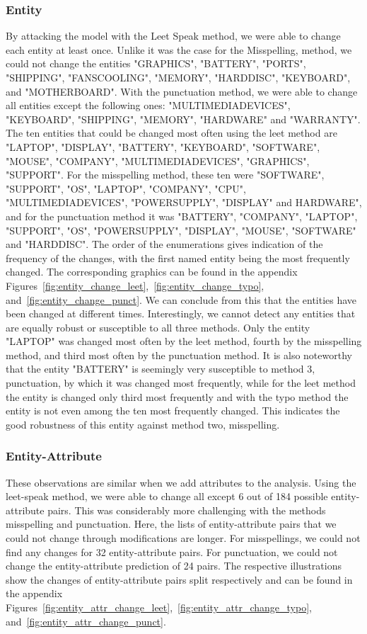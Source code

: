 \subsubsection{Entity}
By attacking the model with the Leet Speak method, we were able to change each entity at least once. Unlike it was the case for the Misspelling,  method, we could not change the entities "GRAPHICS", "BATTERY", "PORTS", "SHIPPING", "FANS\textunderscore COOLING", "MEMORY", "HARD\textunderscore DISC", "KEYBOARD", and "MOTHERBOARD". With the punctuation method, we were able to change all entities except the following ones: "MULTIMEDIA\textunderscore DEVICES", "KEYBOARD", "SHIPPING", "MEMORY", "HARDWARE" and "WARRANTY". 
The ten entities that could be changed most often using the leet method are "LAPTOP", "DISPLAY", "BATTERY", "KEYBOARD", "SOFTWARE", "MOUSE", "COMPANY", "MULTIMEDIA\textunderscore DEVICES", "GRAPHICS", "SUPPORT". For the misspelling method, these ten were "SOFTWARE", "SUPPORT", "OS", "LAPTOP", "COMPANY", "CPU", "MULTIMEDIA\textunderscore DEVICES", "POWER\textunderscore SUPPLY", "DISPLAY" and HARDWARE", and for the punctuation method it was "BATTERY", "COMPANY", "LAPTOP", "SUPPORT", "OS", "POWER\textunderscore SUPPLY", "DISPLAY", "MOUSE", "SOFTWARE" and "HARD\textunderscore DISC". The order of the enumerations gives indication of the frequency of the changes, with the first named entity being the most frequently changed. The corresponding graphics can be found in the appendix Figures~\ref{fig:entity_change_leet},~\ref{fig:entity_change_typo}, and~\ref{fig:entity_change_punct}. 
We can conclude from this that the entities have been changed at different times.  Interestingly, we cannot detect any entities that are equally robust or susceptible to all three methods. Only the entity "LAPTOP" was changed most often by the leet method, fourth by the misspelling method, and third most often by the punctuation method. It is also noteworthy that the entity "BATTERY" is seemingly very susceptible to method 3, punctuation, by which it was changed most frequently, while for the leet method the entity is changed only third most frequently and with the typo method the entity is not even among the ten most frequently changed. This indicates the good robustness of this entity against method two, misspelling. 

\subsubsection{Entity-Attribute}
These observations are similar when we add attributes to the analysis. Using the leet-speak method, we were able to change all except 6 out of 184 possible entity-attribute pairs. This was considerably more challenging with the methods misspelling and punctuation. Here, the lists of entity-attribute pairs that we could not change through modifications are longer. For misspellings, we could not find any changes for 32 entity-attribute pairs. For punctuation, we could not change the entity-attribute prediction of 24 pairs. The respective illustrations show the changes of entity-attribute pairs split respectively and can be found in the appendix Figures~\ref{fig:entity_attr_change_leet},~\ref{fig:entity_attr_change_typo}, and~\ref{fig:entity_attr_change_punct}.

